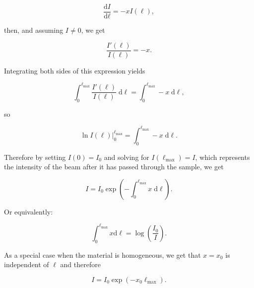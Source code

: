 \documentclass{article}
\newcommand{\diff}[2]{\frac{\text{d} #1}{\text{d} #2}}
\begin{document}
\begin{equation}\label{eq:lamberts-beer}
    \diff{I}{\ell} = -x I(\ell),
\end{equation}

then, and assuming $I \neq 0$, we get

\begin{equation}
    \frac{I'(\ell)}{I(\ell)} = -x.
\end{equation}

Integrating both sides of this expression yields

\begin{equation}
    \int_{0}^{\ell_{\max}} \frac{I'(\ell)}{I(\ell)} \; \mathrm{d}\ell = \int_{0}^{\ell_{\max}} -x \; \mathrm{d}\ell,
\end{equation}

so

\begin{equation}
    \ln{I(\ell)} \big|_{0}^{\ell_{\max}} = \int_{0}^{\ell_{\max}} -x \; \mathrm{d}\ell.
\end{equation}

Therefore by setting $I(0) = I_0$ and solving for $I(\ell_{\max}) = I$, which represents the intensity of the beam after it has passed through the sample, we get

\begin{equation}
    I = I_0 \exp{\left(-\int_{0}^{\ell_{\max}} x \; \mathrm{d}\ell \right)}.
\end{equation}

Or equivalently:

\begin{equation}
    \int_{0}^{\ell_{\max}}x \text{d} \ell = \log\left(\frac{I_0}{I}\right).
\end{equation}

As a special case when the material is homogeneous, we get that $x = x_0$ is independent of $\ell$ and therefore

\begin{equation}
    I = I_0 \exp{(-x_0 \ell_{\max})}.
\end{equation}
\end{document}
